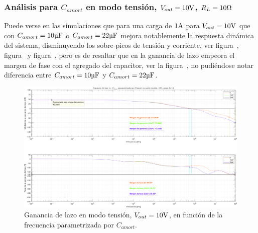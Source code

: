 \subsubsection{Análisis para $C_{amort}$ en modo tensión, $V_{out} = 10 \si[per-mode=symbol]{\volt}$, $R_{L} = 10 \si[per-mode=symbol]{\ohm}$}

Puede verse en las simulaciones que para una carga de $1 \si[per-mode=symbol]{\ampere} $ para $V_{out} = 10 \si[per-mode=symbol]{\volt}$ que con $C_{amort} = 10 \si[per-mode=symbol]{\micro\farad} $ o $C_{amort} = 22 \si[per-mode=symbol]{\micro\farad} $ mejora notablemente la respuesta dinámica del sistema, disminuyendo los sobre-picos de tensión y corriente, ver figura~, figura~ y figura~, pero es de resaltar que en la ganancia de lazo empeora el margen de fase con el agregado del capacitor, ver la figura~, no pudiéndose notar diferencia entre $C_{amort} = 10 \si[per-mode=symbol]{\micro\farad} $ y $C_{amort} = 22 \si[per-mode=symbol]{\micro\farad} $.

\vfill



\clearpage

\begin{figure}[H] %
\begin{center}
\includegraphics[width=1.1 \textwidth, angle=90]{./img/plots/loop/power_supply_CAMORT_LOOP_Modo1.png}
\caption{\label{fig:fig_power_supply_CAMORT_LOOP_Modo1}\footnotesize{Ganancia de lazo en modo tensión, $V_{out} = 10 \si[per-mode=symbol]{\volt}$, en función de la frecuencia parametrizada por $C_{amort}$.}}
\end{center}
\end{figure}


